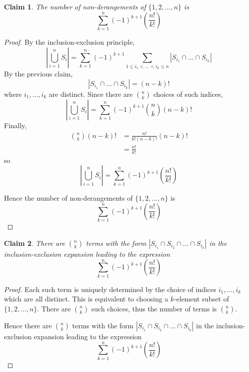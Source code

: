 \documentclass{article}
\newtheorem{claim}{Claim}
\begin{document}
\begin{claim}
    The number of non-derangements of $\{1, 2, \dots, n\}$ is
    \[
    \sum_{k=1}^{n}(-1)^{k+1}\left(\frac{n!}{k!}\right)
    \]
\end{claim}

\begin{proof}
    By the inclusion-exclusion principle,
    \[
    \left|\bigcup_{i=1}^n S_i\right| = \sum_{k=1}^n (-1)^{k+1}\sum_{1 \le i_1 < \dots < i_k \le n}
    |S_{i_1} \cap \dots \cap S_{i_k}|
    \]
    By the previous claim,
    \[
    |S_{i_1}\cap \dots \cap S_{i_k}| = (n - k)!
    \]
    where $i_1, \dots, i_k$ are distinct. Since there are $\binom{n}{k}$ choices of such indices,
    \[
    \left|\bigcup_{i=1}^n S_i\right| = \sum_{k=1}^n (-1)^{k+1}\binom{n}{k}(n - k)!
    \]
    Finally,
    \[
    \begin{aligned}
    \binom{n}{k}(n - k)! &= \frac{n!}{k!(n - k)!}(n - k)! \\
    &= \frac{n!}{k!}
    \end{aligned}
    \]
    so
    \[
    \left|\bigcup_{i=1}^n S_i\right| = \sum_{k=1}^n (-1)^{k+1}\left(\frac{n!}{k!}\right)
    \]

    \medskip

    Hence the number of non-derangements of $\{1, 2, \dots, n\}$ is
    \[
    \sum_{k=1}^{n}(-1)^{k+1}\left(\frac{n!}{k!}\right)
    \]
\end{proof}

\begin{claim}
    There are $\binom{n}{k}$ terms with the form $|S_{i_1} \cap S_{i_2} \cap \dots \cap S_{i_k}|$ in the 
    inclusion-exclusion expansion leading to the expression
    \[
    \sum_{k=1}^{n}(-1)^{k+1}\left(\frac{n!}{k!}\right)
    \]
\end{claim}

\begin{proof}
    Each such term is uniquely determined by the choice of indices $i_1, \dots, i_k$ which are all distinct. This is 
    equivalent to choosing a $k$-element subset of $\{1, 2, \dots, n\}$. There are $\binom{n}{k}$ such choices, thus 
    the number of terms is $\binom{n}{k}$.

    \medskip

    Hence there are $\binom{n}{k}$ terms with the form $|S_{i_1} \cap S_{i_2} \cap \dots \cap S_{i_k}|$ in the 
    inclusion-exclusion expansion leading to the expression
    \[
    \sum_{k=1}^{n}(-1)^{k+1}\left(\frac{n!}{k!}\right)
    \]
\end{proof}
\end{document}

